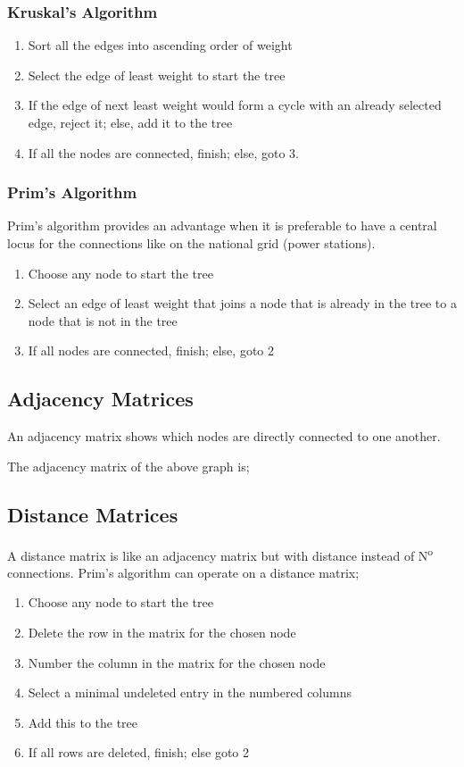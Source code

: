 \documentclass{article}
\begin{document}
\subsubsection{Kruskal's Algorithm}

\begin{enumerate}
	\item Sort all the edges into ascending order of weight
	\item Select the edge of least weight to start the tree
	\item If the edge of next least weight would form a cycle with an already selected edge, reject it; else, add it to the tree
	\item If all the nodes are connected, finish; else, goto 3.
\end{enumerate}

\subsubsection{Prim's Algorithm}

Prim's algorithm provides an advantage when it is preferable to have a central locus for the connections like on the national grid (power stations).
\begin{enumerate}
	\item Choose any node to start the tree
	\item Select an edge of least weight that joins a node that is already in the tree to a node that is not in the tree
	\item If all nodes are connected, finish; else, goto 2
\end{enumerate}

\subsection{Adjacency Matrices}

An adjacency matrix shows which nodes are directly connected to one another.


The adjacency matrix of the above graph is;


\subsection{Distance Matrices}

A distance matrix is like an adjacency matrix but with distance instead of N\textsuperscript{o} connections. Prim's algorithm can operate on a distance matrix;
\begin{enumerate}
	\item Choose any node to start the tree
	\item Delete the row in the matrix for the chosen node
	\item Number the column in the matrix for the chosen node
	\item Select a minimal undeleted entry in the numbered columns
	\item Add this to the tree
	\item If all rows are deleted, finish; else goto 2
\end{enumerate}
\end{document}
